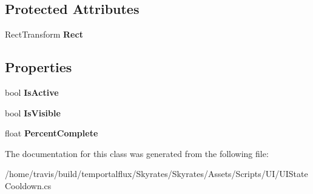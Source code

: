 \subsection*{Protected Attributes}
\begin{DoxyCompactItemize}
\item 
\hypertarget{class_skyrates_1_1_u_i_1_1_u_i_state_cooldown_3_01_t_01_4_a722b57374878edeaa2ba6dd3f7cfb783}{Rect\-Transform {\bfseries Rect}}\label{class_skyrates_1_1_u_i_1_1_u_i_state_cooldown_3_01_t_01_4_a722b57374878edeaa2ba6dd3f7cfb783}

\end{DoxyCompactItemize}
\subsection*{Properties}
\begin{DoxyCompactItemize}
\item 
\hypertarget{class_skyrates_1_1_u_i_1_1_u_i_state_cooldown_3_01_t_01_4_a0f226b11a0d06fd31a3c96af82f1d86a}{bool {\bfseries Is\-Active}}\label{class_skyrates_1_1_u_i_1_1_u_i_state_cooldown_3_01_t_01_4_a0f226b11a0d06fd31a3c96af82f1d86a}

\item 
\hypertarget{class_skyrates_1_1_u_i_1_1_u_i_state_cooldown_3_01_t_01_4_a2e96164a7d8c712a13d04ba44d1a5254}{bool {\bfseries Is\-Visible}}\label{class_skyrates_1_1_u_i_1_1_u_i_state_cooldown_3_01_t_01_4_a2e96164a7d8c712a13d04ba44d1a5254}

\item 
\hypertarget{class_skyrates_1_1_u_i_1_1_u_i_state_cooldown_3_01_t_01_4_af4631eae3b7081e4e342285455e2053d}{float {\bfseries Percent\-Complete}}\label{class_skyrates_1_1_u_i_1_1_u_i_state_cooldown_3_01_t_01_4_af4631eae3b7081e4e342285455e2053d}

\end{DoxyCompactItemize}


The documentation for this class was generated from the following file\-:\begin{DoxyCompactItemize}
\item 
/home/travis/build/temportalflux/\-Skyrates/\-Skyrates/\-Assets/\-Scripts/\-U\-I/U\-I\-State\-Cooldown.\-cs\end{DoxyCompactItemize}
